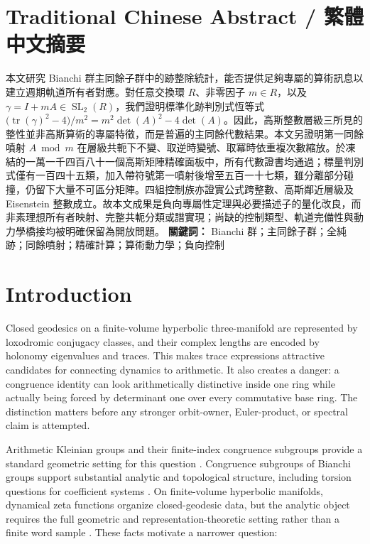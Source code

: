 \documentclass[11pt,a4paper]{article}
\theoremstyle{definition}
\theoremstyle{remark}
\newcommand{\SL}{\operatorname{SL}}
\newcommand{\tr}{\operatorname{tr}}
\begin{document}
\begin{otherlanguage}{chinese-traditional}
\section*{Traditional Chinese Abstract / 繁體中文摘要}
本文研究 Bianchi 群主同餘子群中的跡整除統計，能否提供足夠專屬的算術訊息以建立週期軌道所有者對應。對任意交換環 \(R\)、非零因子 \(m\in R\)，以及 \(\gamma=I+mA\in\SL_2(R)\)，我們證明標準化跡判別式恆等式 \(\bigl(\tr(\gamma)^2-4\bigr)/m^2=m^2\det(A)^2-4\det(A)\)。因此，高斯整數層級三所見的整性並非高斯算術的專屬特徵，而是普遍的主同餘代數結果。本文另證明第一同餘噴射 \(A\bmod m\) 在層級共軛下不變、取逆時變號、取冪時依重複次數縮放。於凍結的一萬一千四百八十一個高斯矩陣精確面板中，所有代數證書均通過；標量判別式僅有一百四十五類，加入帶符號第一噴射後增至五百一十七類，雖分離部分碰撞，仍留下大量不可區分矩陣。四組控制族亦證實公式跨整數、高斯鄰近層級及 Eisenstein 整數成立。故本文成果是負向專屬性定理與必要描述子的量化改良，而非素理想所有者映射、完整共軛分類或譜實現；尚缺的控制類型、軌道完備性與動力學橋接均被明確保留為開放問題。
\noindent\textbf{關鍵詞：} Bianchi 群；主同餘子群；全純跡；同餘噴射；精確計算；算術動力學；負向控制
\end{otherlanguage}

\section{Introduction}

Closed geodesics on a finite-volume hyperbolic three-manifold are represented by loxodromic conjugacy classes, and their complex lengths are encoded by holonomy eigenvalues and traces. This makes trace expressions attractive candidates for connecting dynamics to arithmetic. It also creates a danger: a congruence identity can look arithmetically distinctive inside one ring while actually being forced by determinant one over every commutative base ring. The distinction matters before any stronger orbit-owner, Euler-product, or spectral claim is attempted.

Arithmetic Kleinian groups and their finite-index congruence subgroups provide a standard geometric setting for this question \citep[Chs.~10--11]{MaclachlanReid2003}.
Congruence subgroups of Bianchi groups support substantial analytic and topological structure, including torsion questions for coefficient systems \citep[Introduction and Sec.~2]{PfaffRaimbault2020}.
On finite-volume hyperbolic manifolds, dynamical zeta functions organize closed-geodesic data, but the analytic object requires the full geometric and representation-theoretic setting rather than a finite word sample \citep[abstract and Secs.~3--5]{Pfaff2015}. These facts motivate a narrower question:
\end{document}
